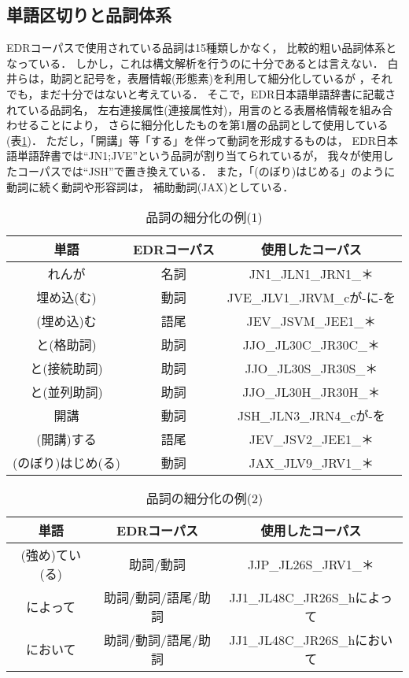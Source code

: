 \subsection{単語区切りと品詞体系}

EDRコーパスで使用されている品詞は15種類しかなく，
比較的粗い品詞体系となっている．
しかし，これは構文解析を行うのに十分であるとは言えない．
白井らは，助詞と記号を，表層情報(形態素)を利用して細分化しているが
\cite{shirai:97}，それでも，まだ十分ではないと考えている．
そこで，EDR日本語単語辞書に記載されている品詞名，
左右連接属性(連接属性対)，用言のとる表層格情報を組み合わせることにより，
さらに細分化したものを第1層の品詞として使用している
(表\ref{tab:pos_example})．
ただし，「開講」等「する」を伴って動詞を形成するものは，
EDR日本語単語辞書では``JN1;JVE''という品詞が割り当てられているが，
我々が使用したコーパスでは``JSH''で置き換えている．
また，「(のぼり)はじめる」のように動詞に続く動詞や形容詞は，
補助動詞(JAX)としている．

\begin{table}[tp]
  \centering
  \caption{品詞の細分化の例(1)}
  \begin{tabular}{|c|c|c|}\hline
    単語 & EDRコーパス & 使用したコーパス \\\hline\hline
    れんが & 名詞 & JN1\_JLN1\_JRN1\_＊ \\\hline
    埋め込(む) & 動詞 & JVE\_JLV1\_JRVM\_cが-に-を \\\hline
    (埋め込)む & 語尾 & JEV\_JSVM\_JEE1\_＊ \\\hline
    と(格助詞) & 助詞 & JJO\_JL30C\_JR30C\_＊ \\\hline
    と(接続助詞) & 助詞 & JJO\_JL30S\_JR30S\_＊ \\\hline
    と(並列助詞) & 助詞 & JJO\_JL30H\_JR30H\_＊ \\\hline
    開講 & 動詞 & JSH\_JLN3\_JRN4\_cが-を \\\hline
    (開講)する & 語尾 & JEV\_JSV2\_JEE1\_＊ \\\hline
    (のぼり)はじめ(る) & 動詞 & JAX\_JLV9\_JRV1\_＊ \\\hline
  \end{tabular}
  \label{tab:pos_example}
\end{table}

\begin{table}[tp]
  \centering
  \caption{品詞の細分化の例(2)}
  \begin{tabular}{|c|c|c|}\hline
    単語 & EDRコーパス & 使用したコーパス \\\hline\hline
    (強め)てい(る) & 助詞/動詞 & JJP\_JL26S\_JRV1\_＊ \\\hline
    によって & 助詞/動詞/語尾/助詞 & JJ1\_JL48C\_JR26S\_hによって
    \\\hline
    において & 助詞/動詞/語尾/助詞 & JJ1\_JL48C\_JR26S\_hにおいて
    \\\hline
  \end{tabular}
  \label{tab:pos_example2}
\end{table}

